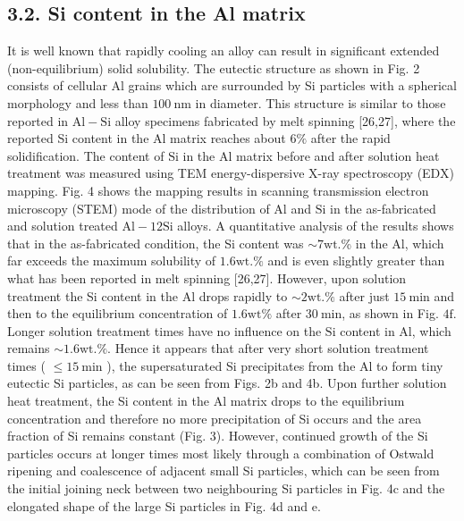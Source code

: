\documentclass[10pt]{article}
\begin{document}
\subsection*{3.2. Si content in the Al matrix}
It is well known that rapidly cooling an alloy can result in significant extended (non-equilibrium) solid solubility. The eutectic structure as shown in Fig. 2 consists of cellular Al grains which are surrounded by Si particles with a spherical morphology and less than $100 \mathrm{~nm}$ in diameter. This structure is similar to those reported in $\mathrm{Al}-\mathrm{Si}$ alloy specimens fabricated by melt spinning [26,27], where the reported Si content in the Al matrix reaches about $6 \%$ after the rapid solidification. The content of $\mathrm{Si}$ in the $\mathrm{Al}$ matrix before and after solution heat treatment was measured using TEM energy-dispersive X-ray spectroscopy (EDX) mapping. Fig. 4 shows the mapping results in scanning transmission electron microscopy (STEM) mode of the distribution of $\mathrm{Al}$ and $\mathrm{Si}$ in the as-fabricated and solution treated $\mathrm{Al}-12 \mathrm{Si}$ alloys. A quantitative analysis of the results shows that in the as-fabricated condition, the Si content was $\sim 7 \mathrm{wt}$.\% in the Al, which far exceeds the maximum solubility of $1.6 \mathrm{wt} . \%$ and is even slightly greater than what has been reported in melt spinning [26,27]. However, upon solution treatment the Si content in the Al drops rapidly to $\sim 2 \mathrm{wt} . \%$ after just $15 \mathrm{~min}$ and then to the equilibrium concentration of $1.6 \mathrm{wt} \%$ after $30 \mathrm{~min}$, as shown in Fig. $4 \mathrm{f}$. Longer solution treatment times have no influence on the $\mathrm{Si}$ content in $\mathrm{Al}$, which remains $\sim 1.6 \mathrm{wt} . \%$. Hence it appears that after very short solution treatment times ( $\leqslant 15 \mathrm{~min}$ ), the supersaturated Si precipitates from the Al to form tiny eutectic Si particles, as can be seen from Figs. 2b and 4b. Upon further solution heat treatment, the Si content in the $\mathrm{Al}$ matrix drops to the equilibrium concentration and therefore no more precipitation of Si occurs and the area fraction of Si remains constant (Fig. 3). However, continued growth of the Si particles occurs at longer times most likely through a combination of Ostwald ripening and coalescence of adjacent small Si particles, which can be seen from the initial joining neck between two neighbouring Si particles in Fig. 4c and the elongated shape of the large Si particles in Fig. 4d and e.
\end{document}
